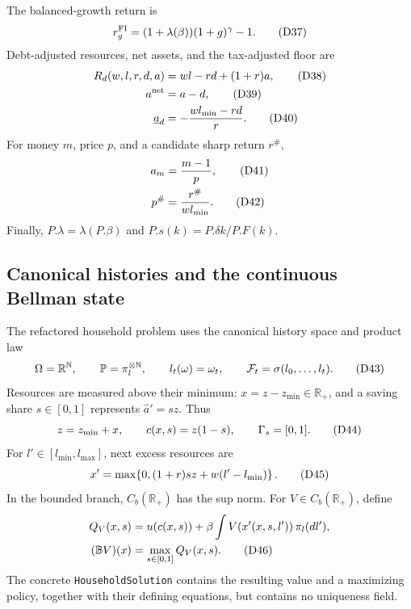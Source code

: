 \documentclass[11pt]{article}
\newcommand{\R}{\mathbb R}
\newcommand{\N}{\mathbb N}
\newcommand{\PP}{\mathbb P}
\newcommand{\leanname}[1]{\nolinkurl{#1}}
\newcommand{\eqD}[1]{\refstepcounter{equation}\tag{D#1}}
\begin{document}
The balanced-growth return is
\begin{equation}
 r_g^{\rm FI}=(1+\lambda(\beta))(1+g)^\gamma-1. \eqD{37}\label{D37}
\end{equation}
Debt-adjusted resources, net assets, and the tax-adjusted floor are
\begin{align}
 R_d(w,l,r,d,a)&=wl-rd+(1+r)a, \eqD{38}\label{D38}\\
 a^{\rm net}&=a-d, \eqD{39}\label{D39}\\
 \underline a_d&=-\frac{wl_{\min}-rd}{r}. \eqD{40}\label{D40}
\end{align}
For money \(m\), price \(p\), and a candidate sharp return \(r^\#\),
\begin{align}
 a_m&=\frac{m-1}{p}, \eqD{41}\label{D41}\\
 p^\#&=\frac{r^\#}{wl_{\min}}. \eqD{42}\label{D42}
\end{align}
Finally, \(P.\lambda=\lambda(P.\beta)\) and
\(P.s(k)=P.\delta k/P.F(k)\).

\subsection{Canonical histories and the continuous Bellman state}

The refactored household problem uses the canonical history space and product
law
\begin{equation}
 \Omega=\R^{\N},\qquad \PP=\pi_l^{\otimes\N},\qquad
 l_t(\omega)=\omega_t,\qquad \mathcal F_t=\sigma(l_0,\ldots,l_t).
 \eqD{43}\label{D43}
\end{equation}
Resources are measured above their minimum: \(x=z-z_{\min}\in\R_+\), and a
saving share \(s\in[0,1]\) represents \(\widehat a'=sz\).  Thus
\begin{equation}
 z=z_{\min}+x,\qquad c(x,s)=z(1-s),\qquad
 \Gamma_s=[0,1]. \eqD{44}\label{D44}
\end{equation}
For \(l'\in[l_{\min},l_{\max}]\), next excess resources are
\begin{equation}
 x'=\max\!\left\{0,(1+r)sz+w(l'-l_{\min})\right\}. \eqD{45}\label{D45}
\end{equation}
In the bounded branch, \(C_b(\R_+)\) has the sup norm.  For
\(V\in C_b(\R_+)\), define
\begin{align}
 Q_V(x,s)&=u(c(x,s))+\beta\int V(x'(x,s,l'))\,\pi_l(dl'),\notag\\
 (\mathbb BV)(x)&=\max_{s\in[0,1]}Q_V(x,s). \eqD{46}\label{D46}
\end{align}
The concrete \leanname{HouseholdSolution} contains the resulting value and a
maximizing policy, together with their defining equations, but contains no
uniqueness field.
\end{document}
